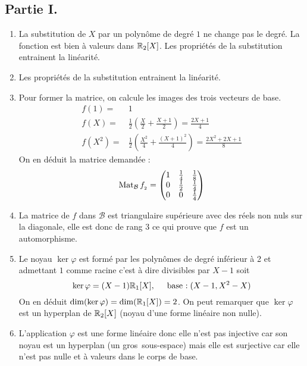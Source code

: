 \subsection*{Partie I.}
\begin{enumerate}  
  \item La substitution de $X$ par un polynôme de degré $1$ ne change pas le degré. La fonction est bien à valeurs dans $\mathbb{R}_2[X]$. Les propriétés de la substitution entrainent la linéarité. 

  \item Les propriétés de la substitution entrainent la linéarité.

  \item Pour former la matrice, on calcule les images des trois vecteurs de base.
\begin{align*}
 f(1) =& 1 \\
 f(X) =& \frac{1}{2}\left( \frac{X}{2}+\frac{X+1}{2}\right)=\frac{2X+1}{4} \\
 f(X^2) =& \frac{1}{2}\left( \frac{X^2}{4}+\frac{(X+1)^2}{4}\right)=\frac{2X^2+2X+1}{8}
\end{align*}
On en déduit la matrice demandée :
\renewcommand{\arraystretch}{1.3}
\begin{displaymath}
 \operatorname{Mat}_{\mathcal B}f_{_2}=
\begin{pmatrix}
 1 & \frac{1}{4} & \frac{1}{8} \\
 0 & \frac{1}{2} & \frac{1}{4} \\
 0 & 0 & \frac{1}{4} 
\end{pmatrix}
\end{displaymath}

 \item La matrice  de $f$ dans $\mathcal B$ est triangulaire supérieure avec des réels non nuls sur la diagonale, elle est donc de rang $3$ ce qui prouve que $f$ est un automorphisme.

 \item Le noyau $\ker \varphi$ est formé par les polynômes de degré inférieur à 2 et admettant $1$ comme racine c'est à dire divisibles par $X-1$ soit 
\begin{displaymath}
 \ker \varphi = (X-1)\mathbb{R}_1[X] , \hspace{0.5cm} \text{base :}\; (X-1, X^2 - X)
\end{displaymath}
On en déduit $\dim(\ker \varphi) = \dim (\mathbb{R}_1[X])=2$. On peut remarquer que $\ker \varphi$ est un hyperplan de $\mathbb{R}_2[X]$ (noyau d'une forme linéaire non nulle).

  \item L'application $\varphi$ est une forme linéaire donc elle n'est pas injective car son noyau est un hyperplan (un \og gros\fg~sous-espace) mais elle est surjective car elle n'est pas nulle et à valeurs dans le corps de base.
\end{enumerate}

